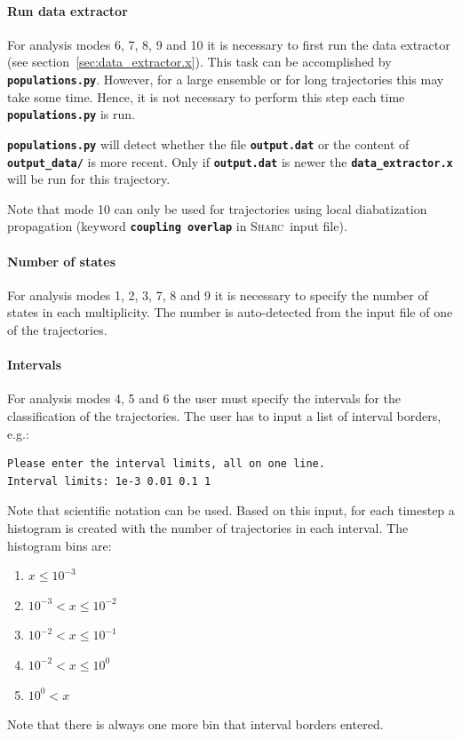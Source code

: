 \documentclass[a4paper,11pt,DIV=15,openany,twoside=false]{scrbook}
\newcommand{\sharc}{\textsc{Sharc}}
\newcommand{\ttt}[1]{\textbf{\texttt{#1}}}
\newenvironment{example}{
  \vspace{0mm}
  \definecolor{shadecolor}{HTML}{E4F4FF}
  \begin{shaded}
}{
  \end{shaded}
}
\begin{document}
\paragraph{Run data extractor}

For analysis modes 6, 7, 8, 9 and 10 it is necessary to first run the data extractor (see section~\ref{sec:data_extractor.x}). This task can be accomplished by \ttt{populations.py}. However, for a large ensemble or for long trajectories this may take some time. Hence, it is not necessary to perform this step each time \ttt{populations.py} is run. 

\ttt{populations.py} will detect whether the file \ttt{output.dat} or the content of \ttt{output\_data/} is more recent. Only if \ttt{output.dat} is newer the \ttt{data\_extractor.x} will be run for this trajectory.

Note that mode 10 can only be used for trajectories using local diabatization propagation (keyword \ttt{coupling overlap} in \sharc\ input file).

\paragraph{Number of states}

For analysis modes 1, 2, 3, 7, 8 and 9 it is necessary to specify the number of states in each multiplicity. The number is auto-detected from the input file of one of the trajectories.

\paragraph{Intervals}

For analysis modes 4, 5 and 6 the user must specify the intervals for the classification of the trajectories. The user has to input a list of interval borders, e.g.:
\begin{example}
\begin{verbatim}
Please enter the interval limits, all on one line.
Interval limits: 1e-3 0.01 0.1 1
\end{verbatim}
\end{example}

Note that scientific notation can be used. Based on this input, for each timestep a histogram is created with the number of trajectories in each interval. The histogram bins are:
\begin{enumerate}
  \item $x\leq10^{-3}$
  \item $10^{-3}<x\leq10^{-2}$
  \item $10^{-2}<x\leq10^{-1}$
  \item $10^{-2}<x\leq10^{0}$
  \item $10^{0}<x$
\end{enumerate}
Note that there is always one more bin that interval borders entered.
\end{document}
